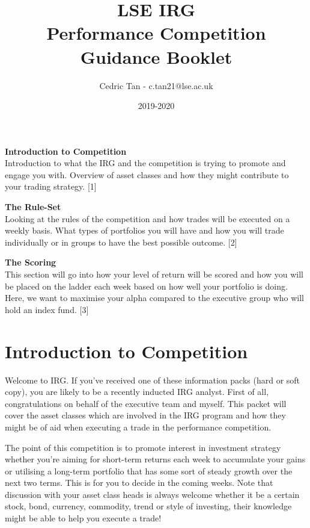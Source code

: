 \documentclass[a4paper]{article}
\title{LSE IRG\\
		Performance Competition\\
		Guidance Booklet}
\author{Cedric Tan - c.tan21@lse.ac.uk}
\date {2019-2020}
\begin{document}
\maketitle
{\small
  \noindent\textbf{Introduction to Competition}\\
  Introduction to what the IRG and the competition is trying to promote and engage you with. Overview of asset classes and how they might contribute to your trading strategy. \hspace*{\fill}[1]

  \vspace{10pt}
  \noindent\textbf{The Rule-Set}\\
  Looking at the rules of the competition and how trades will be executed on a weekly basis. What types of portfolios you will have and how you will trade individually or in groups to have the best possible outcome. \hspace*{\fill}[2]
   
  \vspace{10pt}
  \noindent\textbf{The Scoring}\\
  This section will go into how your level of return will be scored and how you will be placed on the ladder each week based on how well your portfolio is doing. Here, we want to maximise your alpha compared to the executive group who will hold an index fund. \hspace*{\fill}[3]

\newpage
\section{Introduction to Competition}
Welcome to IRG. If you've received one of these information packs (hard or soft copy), you are likely to be a recently inducted IRG analyst. First of all, congratulations on behalf of the executive team and myself. This packet will cover the asset classes which are involved in the IRG program and how they might be of aid when executing a trade in the performance competition.

\vspace{10pt}
\noindent The point of this competition is to promote interest in investment strategy whether you're aiming for short-term returns each week to accumulate your gains or utilising a long-term portfolio that has some sort of steady growth over the next two terms. This is for you to decide in the coming weeks. Note that discussion with your asset class heads is always welcome whether it be a certain stock, bond, currency, commodity, trend or style of investing, their knowledge might be able to help you execute a trade!

}
\end{document}
